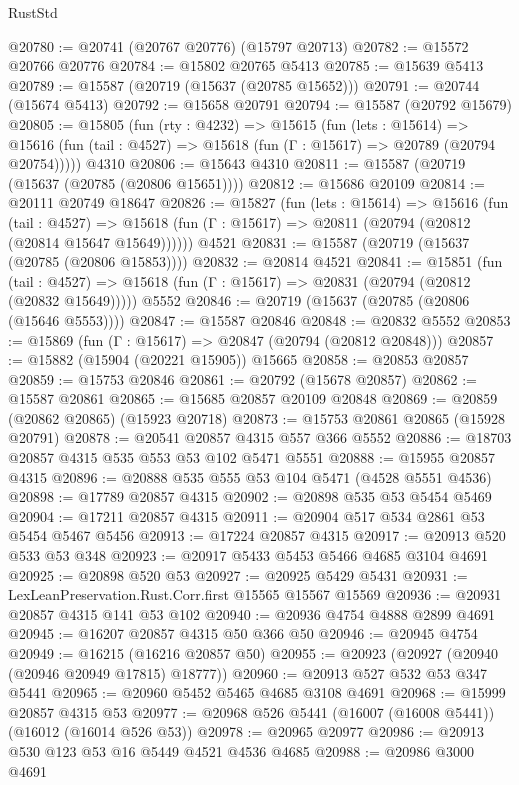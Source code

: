\begin{lexlean}{RustStd}
\begin{coremodule}
@20780 := @20741 (@20767 @20776) (@15797 @20713)
@20782 := @15572 @20766 @20776
@20784 := @15802 @20765 @5413
@20785 := @15639 @5413
@20789 := @15587 (@20719 (@15637 (@20785 @15652)))
@20791 := @20744 (@15674 @5413)
@20792 := @15658 @20791
@20794 := @15587 (@20792 @15679)
@20805 := @15805
    (fun (rty : @4232) =>
    @15615
      (fun (lets : @15614) =>
      @15616 (fun (tail : @4527) => @15618 (fun (Γ : @15617) => @20789 (@20794 @20754)))))
    @4310
@20806 := @15643 @4310
@20811 := @15587 (@20719 (@15637 (@20785 (@20806 @15651))))
@20812 := @15686 @20109
@20814 := @20111 @20749 @18647
@20826 := @15827
    (fun (lets : @15614) =>
    @15616
      (fun (tail : @4527) =>
      @15618 (fun (Γ : @15617) => @20811 (@20794 (@20812 (@20814 @15647 @15649))))))
    @4521
@20831 := @15587 (@20719 (@15637 (@20785 (@20806 @15853))))
@20832 := @20814 @4521
@20841 := @15851
    (fun (tail : @4527) => @15618 (fun (Γ : @15617) => @20831 (@20794 (@20812 (@20832 @15649)))))
    @5552
@20846 := @20719 (@15637 (@20785 (@20806 (@15646 @5553))))
@20847 := @15587 @20846
@20848 := @20832 @5552
@20853 := @15869 (fun (Γ : @15617) => @20847 (@20794 (@20812 @20848)))
@20857 := @15882 (@15904 (@20221 @15905)) @15665
@20858 := @20853 @20857
@20859 := @15753 @20846
@20861 := @20792 (@15678 @20857)
@20862 := @15587 @20861
@20865 := @15685 @20857 @20109 @20848
@20869 := @20859 (@20862 @20865) (@15923 @20718)
@20873 := @15753 @20861 @20865 (@15928 @20791)
@20878 := @20541 @20857 @4315 @557 @366 @5552
@20886 := @18703 @20857 @4315 @535 @553 @53 @102 @5471 @5551
@20888 := @15955 @20857 @4315
@20896 := @20888 @535 @555 @53 @104 @5471 (@4528 @5551 @4536)
@20898 := @17789 @20857 @4315
@20902 := @20898 @535 @53 @5454 @5469
@20904 := @17211 @20857 @4315
@20911 := @20904 @517 @534 @2861 @53 @5454 @5467 @5456
@20913 := @17224 @20857 @4315
@20917 := @20913 @520 @533 @53 @348
@20923 := @20917 @5433 @5453 @5466 @4685 @3104 @4691
@20925 := @20898 @520 @53
@20927 := @20925 @5429 @5431
@20931 := LexLeanPreservation.Rust.Corr.first @15565 @15567 @15569
@20936 := @20931 @20857 @4315 @141 @53 @102
@20940 := @20936 @4754 @4888 @2899 @4691
@20945 := @16207 @20857 @4315 @50 @366 @50
@20946 := @20945 @4754
@20949 := @16215 (@16216 @20857 @50)
@20955 := @20923 (@20927 (@20940 (@20946 @20949 @17815) @18777))
@20960 := @20913 @527 @532 @53 @347 @5441
@20965 := @20960 @5452 @5465 @4685 @3108 @4691
@20968 := @15999 @20857 @4315 @53
@20977 := @20968 @526 @5441 (@16007 (@16008 @5441)) (@16012 (@16014 @526 @53))
@20978 := @20965 @20977
@20986 := @20913 @530 @123 @53 @16 @5449 @4521 @4536 @4685
@20988 := @20986 @3000 @4691

\end{coremodule}
\end{lexlean}
